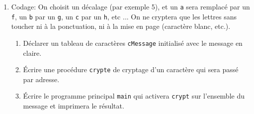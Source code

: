 \documentclass[a4paper]{article}
\begin{document}
\begin{enumerate}
\begin{enumerate}
\end{enumerate}
\item Codage: On choisit un décalage (par exemple 5), et un {\tt a} sera remplacé par un {\tt f}, un {\tt b} par un {\tt g}, un {\tt c} par un {\tt h}, etc ... On ne cryptera que les lettres sans toucher ni à la ponctuation, ni à la mise en page (caractère blanc, etc.). 
\begin{enumerate}
\item Déclarer un tableau de caractères {\tt cMessage} initialisé avec le message en claire.
\item Écrire une procédure {\tt crypte} de cryptage d'un caractère qui sera passé par adresse.
\item Écrire le programme principal {\tt main} qui activera {\tt crypt} sur l'ensemble du message et imprimera le résultat.

\end{enumerate}   
\end{enumerate}
\end{document}
